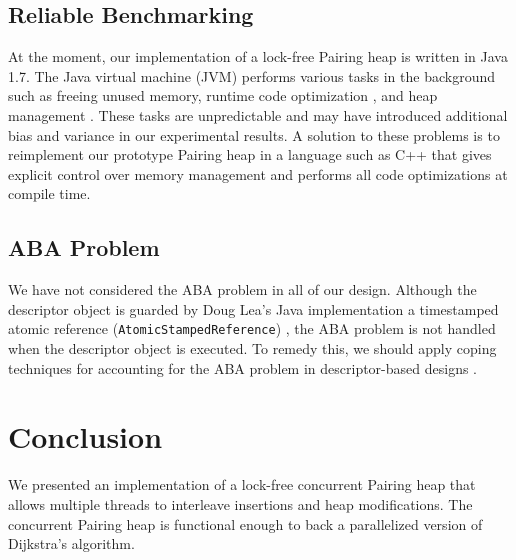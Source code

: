 \documentclass{acm_proc_article-sp}
\begin{document}
\subsection{Reliable Benchmarking}
At the moment, our implementation of a lock-free Pairing heap is
written in Java 1.7. The Java virtual machine (JVM) performs
various tasks in the background \cite{peierls05} such as freeing unused memory, runtime code optimization \cite{ogata10},
and heap management \cite{altman10}. These tasks are unpredictable and may have
introduced additional bias and variance in our experimental results.
A solution to these problems is to reimplement our prototype Pairing heap in a
language such as C++ that gives explicit control over memory management and
performs all code optimizations at compile time.

\subsection{ABA Problem}
We have not considered the ABA problem in all of our design. Although the descriptor
object is guarded by Doug Lea's Java implementation a timestamped atomic reference (\texttt{AtomicStampedReference})
\cite{herlihy08}, the ABA problem is not handled when the descriptor object is executed.
To remedy this, we should apply coping techniques for accounting for the ABA problem
in descriptor-based designs \cite{dechev11} \cite{dechev10}.

\section{Conclusion}
We presented an implementation of a lock-free concurrent Pairing heap that allows
multiple threads to interleave insertions and heap modifications. The concurrent Pairing
heap is functional enough to back a parallelized version of Dijkstra's algorithm.

\end{document}

